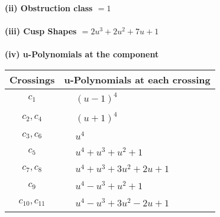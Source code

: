 \documentclass[1p]{elsarticle_modified}
\theoremstyle{definition}
\begin{document}
\flushleft \textbf{(ii) Obstruction class $= 1$}\\~\\
\flushleft \textbf{(iii) Cusp Shapes $= 2 u^3+2 u^2+7 u+1$}\\~\\
\newpage\renewcommand{\arraystretch}{1}
\flushleft \textbf{(iv) u-Polynomials at the component}\newline \\
\begin{tabular}{m{50pt}|m{274pt}}
Crossings & \hspace{64pt}u-Polynomials at each crossing \\
\hline $$\begin{aligned}c_{1}\end{aligned}$$&$\begin{aligned}
&(u-1)^4
\end{aligned}$\\
\hline $$\begin{aligned}c_{2},c_{4}\end{aligned}$$&$\begin{aligned}
&(u+1)^4
\end{aligned}$\\
\hline $$\begin{aligned}c_{3},c_{6}\end{aligned}$$&$\begin{aligned}
&u^4
\end{aligned}$\\
\hline $$\begin{aligned}c_{5}\end{aligned}$$&$\begin{aligned}
&u^4+u^3+u^2+1
\end{aligned}$\\
\hline $$\begin{aligned}c_{7},c_{8}\end{aligned}$$&$\begin{aligned}
&u^4+u^3+3 u^2+2 u+1
\end{aligned}$\\
\hline $$\begin{aligned}c_{9}\end{aligned}$$&$\begin{aligned}
&u^4- u^3+u^2+1
\end{aligned}$\\
\hline $$\begin{aligned}c_{10},c_{11}\end{aligned}$$&$\begin{aligned}
&u^4- u^3+3 u^2-2 u+1
\end{aligned}$\\
\hline
\end{tabular}\\~\\
\end{document}
